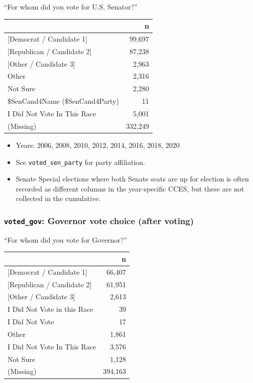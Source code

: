\documentclass[10pt,article,oneside]{memoir}
\theoremstyle{definition}
\begin{document}
``For whom did you vote for U.S. Senator?''

\begin{table}[H]
\centering
\begin{tabular}{lr}
\toprule
 & n\\
\midrule
{[Democrat / Candidate 1]} & 99,697\\
{[Republican / Candidate 2]} & 87,238\\
{[Other / Candidate 3]} & 2,963\\
Other & 2,316\\
Not Sure & 2,280\\
\$SenCand4Name (\$SenCand4Party) & 11\\
I Did Not Vote In This Race & 5,001\\
(Missing) & 332,249\\
\bottomrule
\end{tabular}
\end{table}

\begin{itemize}
\tightlist
\item
  Years: 2006, 2008, 2010, 2012, 2014, 2016, 2018, 2020
\item
  See \texttt{voted\_sen\_party} for party affiliation.
\item
  Senate Special elections where both Senate seats are up for election
  is often recorded as different columns in the year-specific CCES, but
  these are not collected in the cumulative.
\end{itemize}

\hypertarget{voted_gov-governor-vote-choice-after-voting}{%
\subsubsection{\texorpdfstring{\texttt{voted\_gov}: Governor vote choice
(after
voting)}{voted\_gov: Governor vote choice (after voting)}}\label{voted_gov-governor-vote-choice-after-voting}}

``For whom did you vote for Governor?''

\begin{table}[H]
\centering
\begin{tabular}{lr}
\toprule
 & n\\
\midrule
{[Democrat / Candidate 1]} & 66,407\\
{[Republican / Candidate 2]} & 61,951\\
{[Other / Candidate 3]} & 2,613\\
I Did Not Vote in this Race & 39\\
I Did Not Vote & 17\\
Other & 1,861\\
I Did Not Vote In This Race & 3,576\\
Not Sure & 1,128\\
(Missing) & 394,163\\
\bottomrule
\end{tabular}
\end{table}
\end{document}
